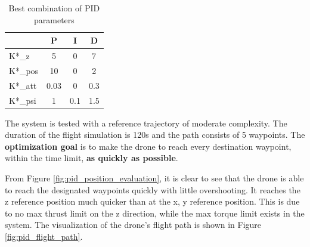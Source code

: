 \documentclass[12pt]{article}
\begin{document}
\begin{table}[H]
    \centering
    \begin{tabular}{|l|c|c|c|}
        \hline
                & P    & I   & D   \\
        \hline
        K*\_z   & 5    & 0   & 7   \\
        K*\_pos & 10   & 0   & 2   \\
        K*\_att & 0.03 & 0   & 0.3 \\
        K*\_psi & 1    & 0.1 & 1.5 \\
        \hline
    \end{tabular}
    \caption{Best combination of PID parameters}
    \label{tab:pid}
\end{table}

The system is tested with a reference trajectory of moderate complexity.
The duration of the flight simulation is 120s and the path consists of 5 waypoints.
The \textbf{optimization goal} is to make the drone to reach every destination waypoint, within the time limit, \textbf{as quickly as possible}.

From Figure \ref{fig:pid_position_evaluation}, it is clear to see that the drone is able to reach the designated waypoints quickly with little overshooting.
It reaches the z reference position much quicker than at the x, y reference position. This is due to no max thrust limit on the z direction, while the max torque limit exists in the system.
The visualization of the drone's flight path is shown in Figure \ref{fig:pid_flight_path}.
\end{document}
